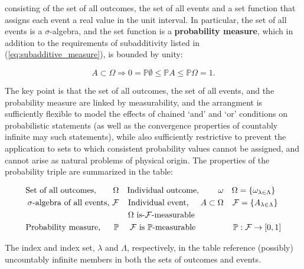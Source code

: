 \documentclass[12pt, twoside, draft]{article}
\begin{document}
consisting of the set of all outcomes, the set of all events and a set function that assigns each event a real value in the unit interval.  In particular, the set of all events is a $\sigma$-algebra, and the set function is a \textbf{probability measure}, which in addition to the requirements of subadditivity listed in (\ref{eq:subadditive_measure}), is bounded by unity:

\begin{equation}
 A \subset \Omega \Rightarrow 0 = \mathbb{P}\emptyset  \leq \mathbb{P}A  \leq  \mathbb{P}\Omega = 1.
\end{equation}

The key point is that the set of all outcomes, the set of all events, and the probability measure are linked by measurability, and the arrangment is sufficiently flexible to model the effects of chained `and' and `or' conditions on probabilistic statements (as well as the convergence properties of countably infinite may such statements), while also sufficiently restrictive to prevent the application to sets to which consistent probability values cannot be assigned, and cannot arise as natural problems of physical origin.  The properties of the probability triple are summarized in the table:

\begin{align}
\text{Set of all outcomes, } \hspace{17pt} \Omega && \text{Individual outcome, } \hspace{20pt} \omega && \Omega = \{\omega_{\lambda \in \Lambda} \} \hspace{7pt} \\
\sigma \text{-algebra of all events, } \mathcal{F} && \text{Individual event, } \hspace{11pt} A \subset \Omega
&&  \mathcal{F} = \{A_{\lambda \in \Lambda} \} \hspace{4pt} \\
&& \Omega \text{ is-}\mathcal{F}\text{-measurable} \hspace{35pt}&& \notag \\
\text{Probability measure, } \hspace{13pt} \mathbb{P} && \mathcal{F} \text{ is }  \mathbb{P} \text{-measurable}\hspace{34pt} && \mathbb{P}: \mathcal{F} \rightarrow [0,1]
\end{align}

The index and index set, $\lambda$ and $\Lambda$, respectively, in the table reference (possibly) uncountably infinite members in both the sets of outcomes and events.
\end{document}
